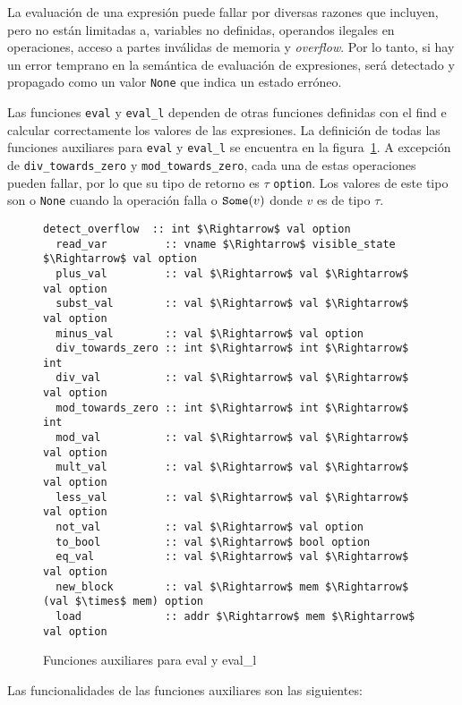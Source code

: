La evaluación de una expresión puede fallar por diversas razones que incluyen, pero no están limitadas a, variables no definidas, operandos ilegales en operaciones, acceso a partes inválidas de memoria y \textit{overflow}.
Por lo tanto, si hay un error temprano en la semántica de evaluación de expresiones, será detectado y propagado como un valor \verb|None| que indica un estado erróneo.

Las funciones \verb|eval| y \verb|eval_l| dependen de otras funciones definidas con el find e calcular correctamente los valores de las expresiones.
La definición de todas las funciones auxiliares para \verb|eval| y \verb|eval_l| se encuentra en la figura~\ref{fig:aux_fun_eval}.
A excepción de \verb|div_towards_zero| y \verb|mod_towards_zero|, cada una de estas operaciones pueden fallar, por lo que su tipo de retorno es $\tau$ \verb|option|.
Los valores de este tipo son o \verb|None| cuando la operación falla o $\verb|Some|(v)$ donde $v$ es de tipo $\tau$.

\begin{figure}
  \begin{lstlisting}[mathescape=true, frame=single]
  detect_overflow  :: int $\Rightarrow$ val option
  read_var         :: vname $\Rightarrow$ visible_state $\Rightarrow$ val option
  plus_val         :: val $\Rightarrow$ val $\Rightarrow$ val option
  subst_val        :: val $\Rightarrow$ val $\Rightarrow$ val option
  minus_val        :: val $\Rightarrow$ val option
  div_towards_zero :: int $\Rightarrow$ int $\Rightarrow$ int
  div_val          :: val $\Rightarrow$ val $\Rightarrow$ val option
  mod_towards_zero :: int $\Rightarrow$ int $\Rightarrow$ int
  mod_val          :: val $\Rightarrow$ val $\Rightarrow$ val option
  mult_val         :: val $\Rightarrow$ val $\Rightarrow$ val option
  less_val         :: val $\Rightarrow$ val $\Rightarrow$ val option
  not_val          :: val $\Rightarrow$ val option
  to_bool          :: val $\Rightarrow$ bool option
  eq_val           :: val $\Rightarrow$ val $\Rightarrow$ val option
  new_block        :: val $\Rightarrow$ mem $\Rightarrow$ (val $\times$ mem) option
  load             :: addr $\Rightarrow$ mem $\Rightarrow$ val option
  \end{lstlisting}

  \caption{Funciones auxiliares para eval y eval\_l}
  \label{fig:aux_fun_eval}
\end{figure}

Las funcionalidades de las funciones auxiliares son las siguientes:

